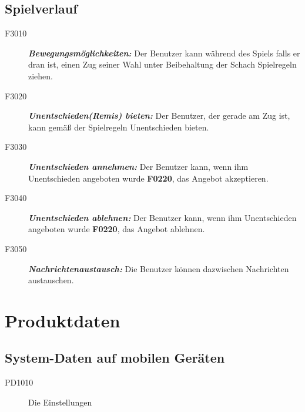 \documentclass[parskip=full]{scrartcl}
\begin{document}
\subsection{Spielverlauf} 
\begin{description}
	\item[F3010]\textbf{\textit{Bewegungsmöglichkeiten: }}Der Benutzer kann während des Spiels falls er dran ist, einen Zug seiner Wahl unter Beibehaltung der Schach Spielregeln ziehen.
	\item[F3020] \textbf{\textit{Unentschieden(Remis) bieten: }} Der Benutzer, der gerade am Zug ist, kann gemäß der Spielregeln Unentschieden bieten.
	\item[F3030] \textbf{\textit{Unentschieden annehmen: }} Der Benutzer kann, wenn ihm Unentschieden angeboten wurde \textbf{F0220}, das Angebot akzeptieren.
	\item[F3040] \textbf{\textit{Unentschieden ablehnen: }} Der Benutzer kann, wenn ihm Unentschieden angeboten wurde \textbf{F0220}, das Angebot ablehnen.
	\item[F3050]\textbf{\textit{Nachrichtenaustausch: }} Die Benutzer können dazwischen Nachrichten austauschen.
\end{description}
\newpage
\section{Produktdaten}

\subsection{System-Daten auf mobilen Geräten}
\begin{description}
	
	\item[PD1010] Die Einstellungen
	
	
%

\end{description}
\end{document}
